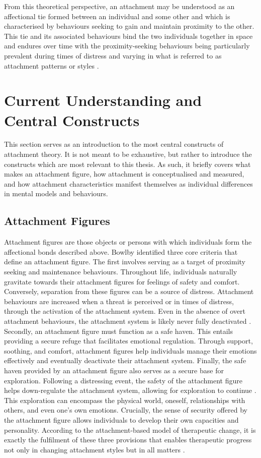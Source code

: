 \documentclass[12pt]{report}
\begin{document}
From this theoretical perspective, an attachment may be understood as an affectional tie formed between an individual and some other and which is characterised by behaviours seeking to gain and maintain proximity to the other.
This tie and its associated behaviours bind the two individuals together in space and endures over time with the proximity-seeking behaviours being particularly prevalent during times of distress and varying in what is referred to as attachment patterns or styles \cite{Ainsworth1970,Bowlby1988}.

\section{Current Understanding and Central Constructs}
This section serves as an introduction to the most central constructs of attachment theory.
It is not meant to be exhaustive, but rather to introduce the constructs which are most relevant to this thesis.
As such, it briefly covers what makes an attachment figure, how attachment is conceptualised and measured, and how attachment characteristics manifest themselves as individual differences in mental models and behaviours.

\subsection*{Attachment Figures}
Attachment figures are those objects or persons with which individuals form the affectional bonds described above.
Bowlby \citeyear{Bowlby1969attachment} identified three core criteria that define an attachment figure.
The first involves serving as a target of proximity seeking and maintenance behaviours.
Throughout life, individuals naturally gravitate towards their attachment figures for feelings of safety and comfort.
Conversely, separation from these figures can be a source of distress.
Attachment behaviours are increased when a threat is perceived or in times of distress, through the activation of the attachment system.
Even in the absence of overt attachment behaviours, the attachment system is likely never fully deactivated \cite{Bowlby1969attachment}.
Secondly, an attachment figure must function as a safe haven. This entails providing a secure refuge that facilitates emotional regulation.
Through support, soothing, and comfort, attachment figures help individuals manage their emotions effectively and eventually deactivate their attachment system.
Finally, the safe haven provided by an attachment figure also serves as a secure base for exploration.
Following a distressing event, the safety of the attachment figure helps down-regulate the attachment system, allowing for exploration to continue \cite{Bowlby1969attachment}.
This exploration can encompass the physical world, oneself, relationships with others, and even one's own emotions.
Crucially, the sense of security offered by the attachment figure allows individuals to develop their own capacities and personality.
According to the attachment-based model of therapeutic change, it is exactly the fulfilment of these three provisions that enables therapeutic progress not only in changing attachment styles but in all matters \cite{Bowlby1969attachment, Mikulincer2013}.
\end{document}
